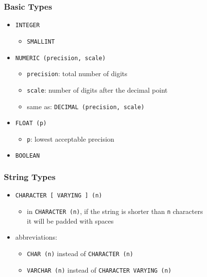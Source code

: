 \documentclass[dvipsnames]{beamer}
\theoremstyle{plain}
\begin{document}
\begin{frame}
  \frametitle{Basic Types}

  \begin{itemize}
    \item \lstinline!INTEGER!
    \begin{itemize}
      \item \lstinline!SMALLINT!
    \end{itemize}

    \pause
    \medskip
    \item \lstinline!NUMERIC (precision, scale)!
    \begin{itemize}
      \item \texttt{precision}: total number of digits
      \item \texttt{scale}: number of digits after the decimal point
      \item same as: \lstinline!DECIMAL (precision, scale)!
    \end{itemize}

    \pause
    \medskip
    \item \lstinline!FLOAT (p)!
    \begin{itemize}
      \item \texttt{p}: lowest acceptable precision
    \end{itemize}

    \pause
    \medskip
    \item \lstinline!BOOLEAN!
  \end{itemize}
\end{frame}

\begin{frame}
  \frametitle{String Types}

  \begin{itemize}
    \item \lstinline!CHARACTER [ VARYING ] (n)!
    \begin{itemize}
      \item in \lstinline!CHARACTER (n)!, if the string is shorter than
	\texttt{n} characters\\
	it will be padded with spaces
    \end{itemize}

    \pause
    \item abbreviations:
    \begin{itemize}
      \item \lstinline!CHAR (n)! instead of \lstinline!CHARACTER (n)!
      \item \lstinline!VARCHAR (n)! instead of \lstinline!CHARACTER VARYING (n)!
    \end{itemize}
  \end{itemize}
\end{frame}
\end{document}
